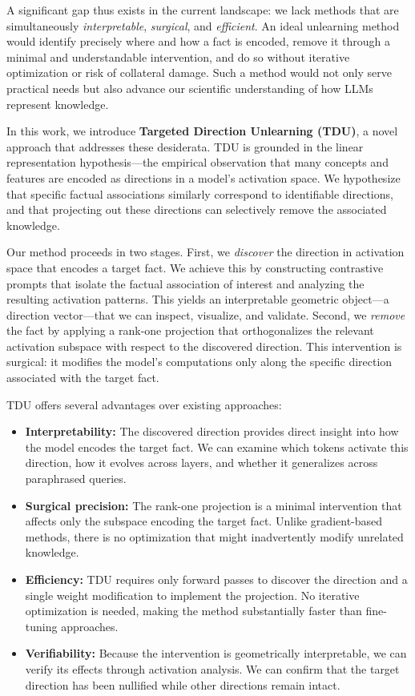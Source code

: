A significant gap thus exists in the current landscape: we lack methods that are simultaneously \emph{interpretable}, \emph{surgical}, and \emph{efficient}. An ideal unlearning method would identify precisely where and how a fact is encoded, remove it through a minimal and understandable intervention, and do so without iterative optimization or risk of collateral damage. Such a method would not only serve practical needs but also advance our scientific understanding of how LLMs represent knowledge.

In this work, we introduce \textbf{Targeted Direction Unlearning (TDU)}, a novel approach that addresses these desiderata. TDU is grounded in the linear representation hypothesis---the empirical observation that many concepts and features are encoded as directions in a model's activation space. We hypothesize that specific factual associations similarly correspond to identifiable directions, and that projecting out these directions can selectively remove the associated knowledge.

Our method proceeds in two stages. First, we \emph{discover} the direction in activation space that encodes a target fact. We achieve this by constructing contrastive prompts that isolate the factual association of interest and analyzing the resulting activation patterns. This yields an interpretable geometric object---a direction vector---that we can inspect, visualize, and validate. Second, we \emph{remove} the fact by applying a rank-one projection that orthogonalizes the relevant activation subspace with respect to the discovered direction. This intervention is surgical: it modifies the model's computations only along the specific direction associated with the target fact.

TDU offers several advantages over existing approaches:

\begin{itemize}
    \item \textbf{Interpretability:} The discovered direction provides direct insight into how the model encodes the target fact. We can examine which tokens activate this direction, how it evolves across layers, and whether it generalizes across paraphrased queries.
    
    \item \textbf{Surgical precision:} The rank-one projection is a minimal intervention that affects only the subspace encoding the target fact. Unlike gradient-based methods, there is no optimization that might inadvertently modify unrelated knowledge.
    
    \item \textbf{Efficiency:} TDU requires only forward passes to discover the direction and a single weight modification to implement the projection. No iterative optimization is needed, making the method substantially faster than fine-tuning approaches.
    
    \item \textbf{Verifiability:} Because the intervention is geometrically interpretable, we can verify its effects through activation analysis. We can confirm that the target direction has been nullified while other directions remain intact.
\end{itemize}

